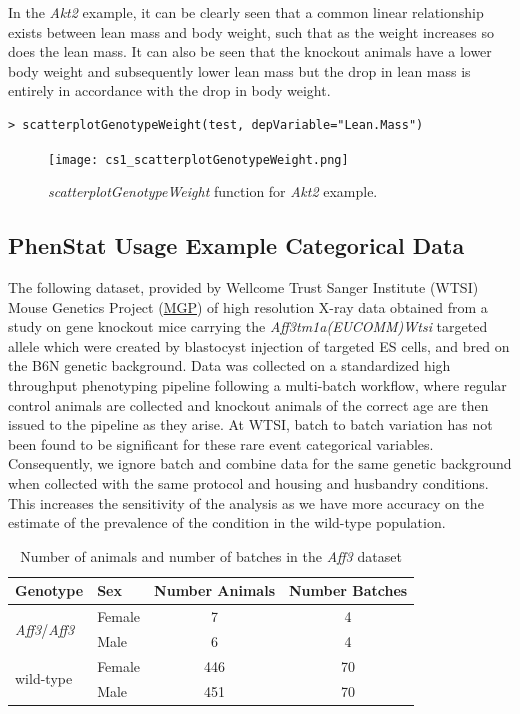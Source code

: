 \documentclass[12pt,a4paper]{article}
\begin{document}
In the \textit{Akt2} example, it can be clearly seen that a common linear relationship exists between lean mass and body weight, such that as the weight increases so does the lean mass. 
It can also be seen that the knockout animals have a lower body weight and subsequently lower lean mass but the drop in lean mass is entirely in accordance with the drop in body weight. 

\begingroup
    \fontsize{8pt}{12pt}\selectfont
\begin{verbatim}
> scatterplotGenotypeWeight(test, depVariable="Lean.Mass")
\end{verbatim}
\endgroup 

\begin{figure}[H]%
\centerline{\texttt{[image: cs1\_scatterplotGenotypeWeight.png]}}
\caption{\textit{scatterplotGenotypeWeight} function for \textit{Akt2} example.}\label{fig:23}
\end{figure}

\subsection{PhenStat Usage Example Categorical Data}
The following dataset, provided by Wellcome Trust Sanger Institute (WTSI) Mouse Genetics Project (\href{http://www.sanger.ac.uk/resources/mouse/}{MGP}) of high resolution X-ray data obtained from 
a study on gene knockout mice carrying the \textit{Aff3tm1a(EUCOMM)Wtsi} targeted allele which were created by blastocyst injection of targeted ES cells, and bred on the B6N genetic background. 
Data was collected on a standardized high throughput phenotyping pipeline following a multi-batch workflow, where regular control animals are collected and knockout animals of the correct age are then issued to the pipeline as they arise. 
At WTSI, batch to batch variation has not been found to be significant for these rare event categorical variables. 
Consequently, we ignore batch and combine data for the same genetic background when collected with the same protocol and housing and husbandry conditions. 
This increases the sensitivity of the analysis as we have more accuracy on the estimate of the prevalence of the condition in the wild-type population.

\begin{table}[!h]
\begin{center}
\begin{tabular}{| l | l | c | c |}
  \hline
Genotype&Sex&Number Animals&Number Batches\\\hline
\multirow{2}{*}{\textit{Aff3}\slash \textit{Aff3}}&Female&7&4\\
			    &Male&6&4\\
			    \hline
\multirow{2}{*}{wild-type}&Female&446&70\\
			    &Male&451&70\\

\hline  
\end{tabular}
\caption{Number of animals and number of batches in the \textit{Aff3} dataset}\label{table:09}
\end{center}
\end{table}
\end{document}
